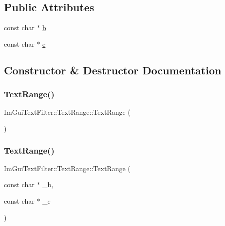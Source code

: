\subsection*{Public Attributes}
\begin{DoxyCompactItemize}
\item 
const char $\ast$ \hyperlink{struct_im_gui_text_filter_1_1_text_range_a705cf9c8fb0796b3bab9cf20cb18b0ca}{b}
\item 
const char $\ast$ \hyperlink{struct_im_gui_text_filter_1_1_text_range_a20daef0e47167d49a017d8f54cb7c607}{e}
\end{DoxyCompactItemize}


\subsection{Constructor \& Destructor Documentation}
\hypertarget{struct_im_gui_text_filter_1_1_text_range_a5a6548fd40884ef5837e6a1ffa33af61}{}\label{struct_im_gui_text_filter_1_1_text_range_a5a6548fd40884ef5837e6a1ffa33af61} 
\subsubsection{\texorpdfstring{Text\+Range()}{TextRange()}\hspace{0.1cm}{\footnotesize\ttfamily [1/2]}}
{\footnotesize\ttfamily Im\+Gui\+Text\+Filter\+::\+Text\+Range\+::\+Text\+Range (\begin{DoxyParamCaption}{ }\end{DoxyParamCaption})}

\hypertarget{struct_im_gui_text_filter_1_1_text_range_a4a2b377d4fd141fc3664378041f9f007}{}\label{struct_im_gui_text_filter_1_1_text_range_a4a2b377d4fd141fc3664378041f9f007} 
\subsubsection{\texorpdfstring{Text\+Range()}{TextRange()}\hspace{0.1cm}{\footnotesize\ttfamily [2/2]}}
{\footnotesize\ttfamily Im\+Gui\+Text\+Filter\+::\+Text\+Range\+::\+Text\+Range (\begin{DoxyParamCaption}\item[{const char $\ast$}]{\+\_\+b,  }\item[{const char $\ast$}]{\+\_\+e }\end{DoxyParamCaption})}



